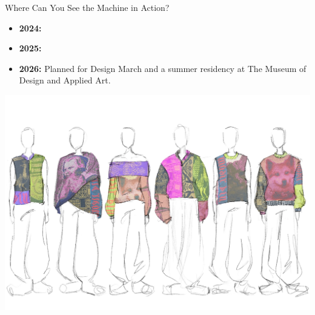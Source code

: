 \documentclass[
    NAME={Dr. Helga Ingimundardóttir},
    EMAIL={helgaingim@hi.is},
    FACULTY={Industrial Engineering},
    TITLE={HiDef Textiles: Reviving Tradition with Innovation},
    SUBTITLE={Empowering Creativity and Sustainability in Textile Production through Digital Transformation},
    SEMINAR={Reykjavík DataBeers},
    DATE={January 25, 2025},
    WIDE={true}
]{HI-LaTeX/hi-beamer}
\begin{document}
\begin{frame}{Where Can You See the Machine in Action?}
    \begin{itemize}
        \item \textbf{2024:} 
        \item \textbf{2025:} 
        
        \item \textbf{2026:} Planned for \alert{Design March} and a summer residency at \alert{The Museum of Design and Applied Art}.
    \end{itemize}
    \includegraphics[width=\textwidth, trim=0 0 0 180pt, clip]{include/gisa.JPG}
\end{frame}
\end{document}

